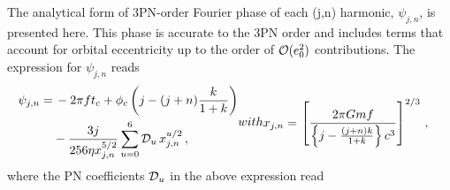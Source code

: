 \documentclass[aps,prd,twocolumn,superscriptaddress,groupedaddress,nofootinbib,showpacs,eqsecnum,useAms]{revtex4-2}
\begin{document}
The analytical form of 3PN-order Fourier phase of each (j,n) harmonic, $\psi_{j,n}$, is presented here. This phase is accurate to the 3PN order and includes terms that account for orbital eccentricity up to the order of ${\cal O}(e_0^2)$ contributions. The expression for $\psi_{j,n}$ reads
\begin{subequations}
\label{eq:Ecck_psi_full}
\begin{align}
\psi_{j,n} =& \, -2 \pi  f t_c+\phi_c \left(j-(j+n)\frac{k}{1+k} \right) \notag \\
& - \frac{3 j}{256 \eta  x_{j,n}^{5/2}} \sum _{u=0}^6 {\cal D}_u\,x_{j,n}^{u/2}\,,\label{eq:Ecck_psi_full_}
\end{align}
with
\begin{align}
x_{j,n} =& \, \left[ \frac{2 \pi G m f}{\left\{j - \frac{(j+n)k}{1+k}\right\}c^3} \right]^{2/3}\,, 
\end{align}
\end{subequations}
where the PN coefficients ${\cal D}_u$ in the above expression read
\end{document}
